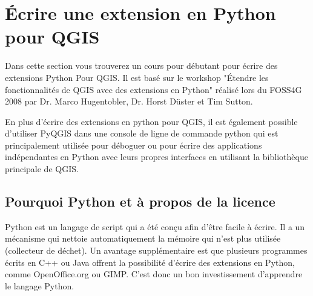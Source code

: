 
\section{Écrire une extension en Python pour QGIS}


Dans cette section vous trouverez un cours pour débutant pour écrire des
extensions Python Pour QGIS. Il est basé sur le workshop "Étendre les
fonctionnalités de QGIS avec des extensions en Python" réalisé lors du FOSS4G 2008
par  Dr. Marco Hugentobler, Dr. Horst Düster et Tim Sutton.

En plus d'écrire des extensions en python pour QGIS, il est également possible
d'utiliser PyQGIS dans une console de ligne de commande python qui est
principalement utilisée pour déboguer ou pour écrire des applications
indépendantes en Python avec leurs propres interfaces en utilisant la
bibliothèque principale de QGIS.

\subsection{Pourquoi Python et à propos de la licence}

Python est un langage de script qui a été conçu afin d'être facile à écrire. Il
a un mécanisme qui nettoie automatiquement la mémoire qui n'est plus utilisée
(collecteur de déchet). Un avantage supplémentaire est que plusieurs programmes
écrits en C++ ou Java offrent la possibilité d'écrire des extensions en Python,
comme OpenOffice.org ou GIMP. C'est donc un bon investissement d'apprendre le
langage Python.

